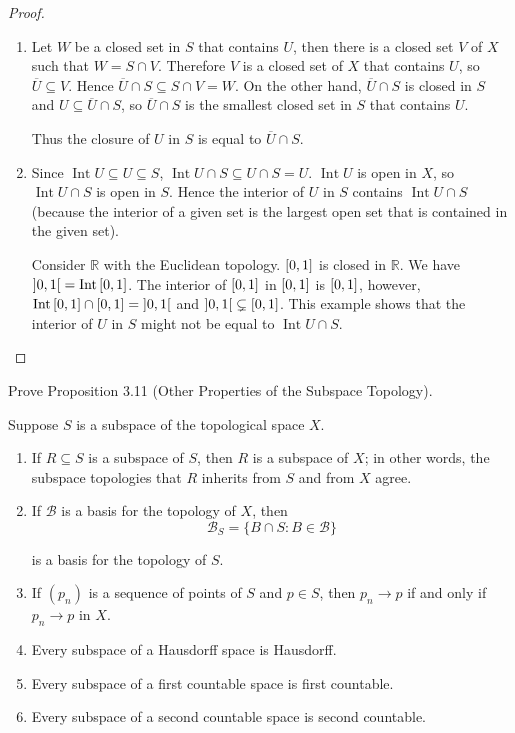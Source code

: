 \begin{proof}
    \begin{enumerate}[label={(\alph*)}]
        \item Let $W$ be a closed set in $S$ that contains $U$, then there is a closed set $V$ of $X$ such that $W = S\cap V$. Therefore $V$ is a closed set of $X$ that contains $U$, so $\overline{U}\subseteq V$. Hence $\overline{U}\cap S\subseteq S\cap V = W$. On the other hand, $\overline{U}\cap S$ is closed in $S$ and $U\subseteq \overline{U}\cap S$, so $\overline{U}\cap S$ is the smallest closed set in $S$ that contains $U$.

              Thus the closure of $U$ in $S$ is equal to $\overline{U}\cap S$.
        \item Since $\operatorname{Int} U\subseteq U\subseteq S$, $\operatorname{Int}U\cap S\subseteq U\cap S = U$. $\operatorname{Int}U$ is open in $X$, so $\operatorname{Int} U\cap S$ is open in $S$. Hence the interior of $U$ in $S$ contains $\operatorname{Int}U\cap S$ (because the interior of a given set is the largest open set that is contained in the given set).

              Consider $\mathbb{R}$ with the Euclidean topology. $\left[{0,1}\right]$ is closed in $\mathbb{R}$. We have $\left]{0, 1}\right[ = \operatorname{Int}\left[{0, 1}\right]$. The interior of $\left[{0,1}\right]$ in $\left[{0,1}\right]$ is $\left[{0,1}\right]$, however, $\operatorname{Int}\left[{0,1}\right]\cap \left[{0,1}\right] = \left]{0,1}\right[$ and $\left]{0,1}\right[\subsetneq\left[{0,1}\right]$. This example shows that the interior of $U$ in $S$ might not be equal to $\operatorname{Int} U\cap S$.
    \end{enumerate}
\end{proof}

\begin{exercise}{3.12}
    Prove Proposition 3.11 (Other Properties of the Subspace Topology).

    Suppose $S$ is a subspace of the topological space $X$.
    \begin{enumerate}[label={(\alph*)}]
        \item If $R\subseteq S$ is a subspace of $S$, then $R$ is a subspace of $X$; in other words, the subspace topologies that $R$ inherits from $S$ and from $X$ agree.
        \item If $\mathscr{B}$ is a basis for the topology of $X$, then
              \[
                  \mathscr{B}_{S} = \{ B\cap S: B\in\mathscr{B} \}
              \]

              is a basis for the topology of $S$.
        \item If ${(p_{n})}$ is a sequence of points of $S$ and $p\in S$, then $p_{n}\to p$ if and only if $p_{n}\to p$ in $X$.
        \item Every subspace of a Hausdorff space is Hausdorff.
        \item Every subspace of a first countable space is first countable.
        \item Every subspace of a second countable space is second countable.
    \end{enumerate}
\end{exercise}

